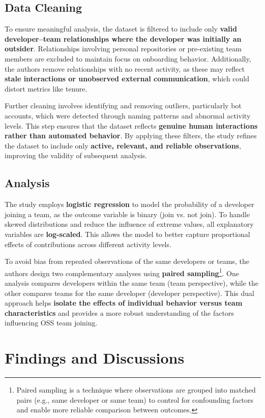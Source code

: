 \subsection{Data Cleaning}
To ensure meaningful analysis, the dataset is filtered to include only \textbf{valid developer–team relationships where the developer was initially an outsider}. Relationships involving personal repositories or pre-existing team members are excluded to maintain focus on onboarding behavior. Additionally, the authors remove relationships with no recent activity, as these may reflect \textbf{stale interactions or unobserved external communication}, which could distort metrics like tenure.

Further cleaning involves identifying and removing outliers, particularly bot accounts, which were detected through naming patterns and abnormal activity levels. This step ensures that the dataset reflects \textbf{genuine human interactions rather than automated behavior}. By applying these filters, the study refines the dataset to include only \textbf{active, relevant, and reliable observations}, improving the validity of subsequent analysis.

\subsection{Analysis}
The study employs \textbf{logistic regression} to model the probability of a developer joining a team, as the outcome variable is binary (join vs. not join). To handle skewed distributions and reduce the influence of extreme values, all explanatory variables are \textbf{log-scaled}. This allows the model to better capture proportional effects of contributions across different activity levels.

To avoid bias from repeated observations of the same developers or teams, the authors design two complementary analyses using \textbf{paired sampling}\footnote{Paired sampling is a technique where observations are grouped into matched pairs (e.g., same developer or same team) to control for confounding factors and enable more reliable comparison between outcomes.}. One analysis compares developers within the same team (team perspective), while the other compares teams for the same developer (developer perspective). This dual approach helps \textbf{isolate the effects of individual behavior versus team characteristics} and provides a more robust understanding of the factors influencing OSS team joining.

\section{Findings and Discussions}
